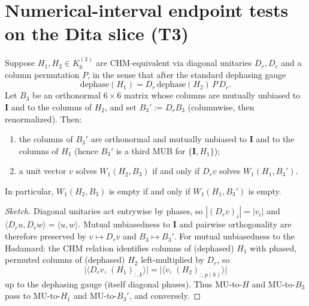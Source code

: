 
\section{Numerical-interval endpoint tests on the Dita slice (T3)}
\label{sec:proof-t3}

\begin{lemma}\label{lem:chm-w1}
Suppose $H_1,H_2\in K_6^{(3)}$ are CHM-equivalent via diagonal unitaries $D_r,D_c$ and a column permutation $P$, in the sense that after the standard dephasing gauge
\[
\mathrm{dephase}(H_1)=D_r\,\mathrm{dephase}(H_2)\,P\,D_c.
\]
Let $B_3$ be an orthonormal $6\times6$ matrix whose columns are mutually unbiased to $\mathbf{I}$ and to the columns of $H_2$, and set $B_3':=D_r B_3$ (columnwise, then renormalized).
Then:
\begin{enumerate}
    \item the columns of $B_3'$ are orthonormal and mutually unbiased to $\mathbf{I}$ and to the columns of $H_1$ (hence $B_3'$ is a third MUB for $\{\mathbf{I},H_1\}$);
    \item a unit vector $v$ solves $W_1(H_2,B_3)$ if and only if $D_r v$ solves $W_1(H_1,B_3')$.
\end{enumerate}
In particular, $W_1(H_2,B_3)$ is empty if and only if $W_1(H_1,B_3')$ is empty.
\end{lemma}

\begin{proof}[Sketch]
Diagonal unitaries act entrywise by phases, so $| (D_r v)_i |=|v_i|$ and $\langle D_r u, D_r w\rangle=\langle u,w\rangle$.
Mutual unbiasedness to $\mathbf{I}$ and pairwise orthogonality are therefore preserved by $v\mapsto D_r v$ and $B_3\mapsto B_3'$.
For mutual unbiasedness to the Hadamard: the CHM relation identifies columns of (dephased) $H_1$ with phased, permuted columns of (dephased) $H_2$ left-multiplied by $D_r$, so
\[
\bigl|\langle D_r v,\, (H_1)_{:,k}\rangle\bigr|
=
\bigl|\langle v,\, (H_2)_{:,p(k)}\rangle\bigr|
\]
up to the dephasing gauge (itself diagonal phases).
Thus MU-to-$H$ and MU-to-$B_3$ pass to MU-to-$H_1$ and MU-to-$B_3'$, and conversely.
\end{proof}

